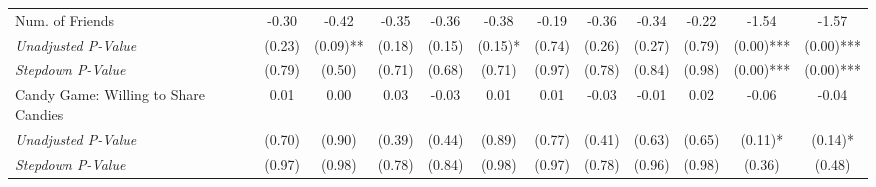 \begin{tabular}{l c c c c c c c c c c c}
Num. of Friends & -0.30 & -0.42 & -0.35 & -0.36 & -0.38 & -0.19 & -0.36 & -0.34 & -0.22 & -1.54 & -1.57 \\
\quad \textit{Unadjusted P-Value} & (0.23) & (0.09)** & (0.18) & (0.15) & (0.15)* & (0.74) & (0.26) & (0.27) & (0.79) & (0.00)*** & (0.00)*** \\
\quad \textit{Stepdown P-Value} & (0.79) & (0.50) & (0.71) & (0.68) & (0.71) & (0.97) & (0.78) & (0.84) & (0.98) & (0.00)*** & (0.00)*** \\
Candy Game: Willing to Share Candies & 0.01 & 0.00 & 0.03 & -0.03 & 0.01 & 0.01 & -0.03 & -0.01 & 0.02 & -0.06 & -0.04 \\
\quad \textit{Unadjusted P-Value} & (0.70) & (0.90) & (0.39) & (0.44) & (0.89) & (0.77) & (0.41) & (0.63) & (0.65) & (0.11)* & (0.14)* \\
\quad \textit{Stepdown P-Value} & (0.97) & (0.98) & (0.78) & (0.84) & (0.98) & (0.97) & (0.78) & (0.96) & (0.98) & (0.36) & (0.48) \\
\bottomrule
\end{tabular}
